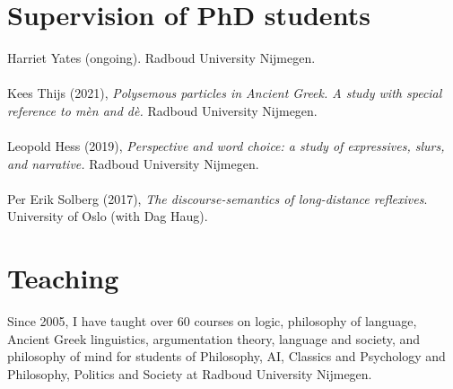 \documentclass[a4paper,11pt]{article}
\begin{document}


\section*{Supervision of PhD students}

Harriet Yates (ongoing). Radboud University Nijmegen.\\\\  
Kees Thijs (2021), \emph{Polysemous particles in Ancient Greek. A study with special reference to \emph{m\`en} and \emph{d\`e}.} Radboud University Nijmegen.\\\\
Leopold Hess (2019), \emph{Perspective and word choice: a study of expressives, slurs, and narrative.} Radboud University Nijmegen.\\\\
Per Erik Solberg (2017), \emph{The discourse-semantics of long-distance reflexives}. University of Oslo (with Dag Haug).








\section*{Teaching}

Since 2005, I have taught over 60 courses on logic, philosophy of language, Ancient Greek linguistics, argumentation theory, language and society, and philosophy of mind for students of Philosophy, AI, Classics and Psychology and Philosophy, Politics and Society at Radboud University Nijmegen.
\end{document}
